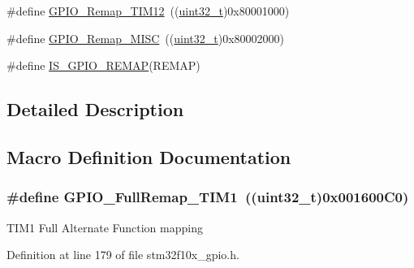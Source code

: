 \begin{DoxyCompactItemize}
\item 
\#define \hyperlink{group___g_p_i_o___remap__define_ga44d3d86a684f62f9142d34ea5975a637}{G\+P\+I\+O\+\_\+\+Remap\+\_\+\+T\+I\+M12}~((\hyperlink{_p_e___types_8h_a33594304e786b158f3fb30289278f5af}{uint32\+\_\+t})0x80001000)
\item 
\#define \hyperlink{group___g_p_i_o___remap__define_ga543f3626303b3452528cb622ad088d26}{G\+P\+I\+O\+\_\+\+Remap\+\_\+\+M\+I\+SC}~((\hyperlink{_p_e___types_8h_a33594304e786b158f3fb30289278f5af}{uint32\+\_\+t})0x80002000)
\item 
\#define \hyperlink{group___g_p_i_o___remap__define_gaccf4664689f281fd4ee91ef16c9dc985}{I\+S\+\_\+\+G\+P\+I\+O\+\_\+\+R\+E\+M\+AP}(R\+E\+M\+AP)
\end{DoxyCompactItemize}


\subsection{Detailed Description}


\subsection{Macro Definition Documentation}
\subsubsection[{\texorpdfstring{G\+P\+I\+O\+\_\+\+Full\+Remap\+\_\+\+T\+I\+M1}{GPIO_FullRemap_TIM1}}]{\setlength{\rightskip}{0pt plus 5cm}\#define G\+P\+I\+O\+\_\+\+Full\+Remap\+\_\+\+T\+I\+M1~(({\bf uint32\+\_\+t})0x001600\+C0)}\hypertarget{group___g_p_i_o___remap__define_gaf1f2d5cbc2281b3e3a6cc51c3fe7f77f}{}\label{group___g_p_i_o___remap__define_gaf1f2d5cbc2281b3e3a6cc51c3fe7f77f}
T\+I\+M1 Full Alternate Function mapping 

Definition at line 179 of file stm32f10x\+\_\+gpio.\+h.

